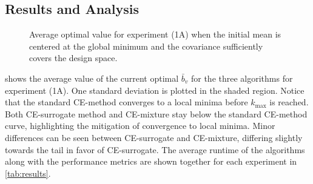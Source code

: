 \subsection{Results and Analysis} \label{sec:results}

\begin{figure}[!hb]
  \resizebox{0.9\columnwidth}{!}{}
  \caption{
    \label{fig:experiment_1a}
    Average optimal value for experiment (1A) when the initial mean is centered at the global minimum and the covariance sufficiently covers the design space.
  }
\end{figure}

 shows the average value of the current optimal $\bar{b}_v$ for the three algorithms for experiment (1A). 
One standard deviation is plotted in the shaded region.
Notice that the standard CE-method converges to a local minima before $k_\text{max}$ is reached.
Both CE-surrogate method and CE-mixture stay below the standard CE-method curve, highlighting the mitigation of convergence to local minima.
Minor differences can be seen between CE-surrogate and CE-mixture, differing slightly towards the tail in favor of CE-surrogate.
The average runtime of the algorithms along with the performance metrics are shown together for each experiment in \cref{tab:results}.


